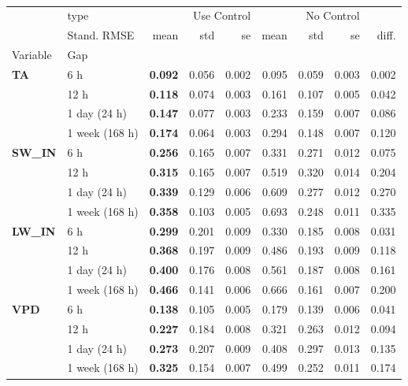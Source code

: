 \begin{table}
\centering
\caption{\CapControl}
\label{tbl:control}
\begin{tabular}{p{2.1cm}l|rrr|rrr|r}
\toprule
 & type & \multicolumn{3}{r}{Use Control} & \multicolumn{3}{r}{No Control} &  \\
 & Stand. RMSE & mean & std & se & mean & std & se & diff. \\
Variable & Gap &  &  &  &  &  &  &  \\
\midrule
\multirow[c]{4}{*}{\textbf{TA}} & 6 h & \bfseries 0.092 & 0.056 & 0.002 & 0.095 & 0.059 & 0.003 & 0.002 \\
 & 12 h & \bfseries 0.118 & 0.074 & 0.003 & 0.161 & 0.107 & 0.005 & 0.042 \\
 & 1 day (24 h) & \bfseries 0.147 & 0.077 & 0.003 & 0.233 & 0.159 & 0.007 & 0.086 \\
 & 1 week (168 h) & \bfseries 0.174 & 0.064 & 0.003 & 0.294 & 0.148 & 0.007 & 0.120 \\
\cline{1-9}
\multirow[c]{4}{*}{\textbf{SW\_IN}} & 6 h & \bfseries 0.256 & 0.165 & 0.007 & 0.331 & 0.271 & 0.012 & 0.075 \\
 & 12 h & \bfseries 0.315 & 0.165 & 0.007 & 0.519 & 0.320 & 0.014 & 0.204 \\
 & 1 day (24 h) & \bfseries 0.339 & 0.129 & 0.006 & 0.609 & 0.277 & 0.012 & 0.270 \\
 & 1 week (168 h) & \bfseries 0.358 & 0.103 & 0.005 & 0.693 & 0.248 & 0.011 & 0.335 \\
\cline{1-9}
\multirow[c]{4}{*}{\textbf{LW\_IN}} & 6 h & \bfseries 0.299 & 0.201 & 0.009 & 0.330 & 0.185 & 0.008 & 0.031 \\
 & 12 h & \bfseries 0.368 & 0.197 & 0.009 & 0.486 & 0.193 & 0.009 & 0.118 \\
 & 1 day (24 h) & \bfseries 0.400 & 0.176 & 0.008 & 0.561 & 0.187 & 0.008 & 0.161 \\
 & 1 week (168 h) & \bfseries 0.466 & 0.141 & 0.006 & 0.666 & 0.161 & 0.007 & 0.200 \\
\cline{1-9}
\multirow[c]{4}{*}{\textbf{VPD}} & 6 h & \bfseries 0.138 & 0.105 & 0.005 & 0.179 & 0.139 & 0.006 & 0.041 \\
 & 12 h & \bfseries 0.227 & 0.184 & 0.008 & 0.321 & 0.263 & 0.012 & 0.094 \\
 & 1 day (24 h) & \bfseries 0.273 & 0.207 & 0.009 & 0.408 & 0.297 & 0.013 & 0.135 \\
 & 1 week (168 h) & \bfseries 0.325 & 0.154 & 0.007 & 0.499 & 0.252 & 0.011 & 0.174 \\

\end{tabular}
\end{table}
